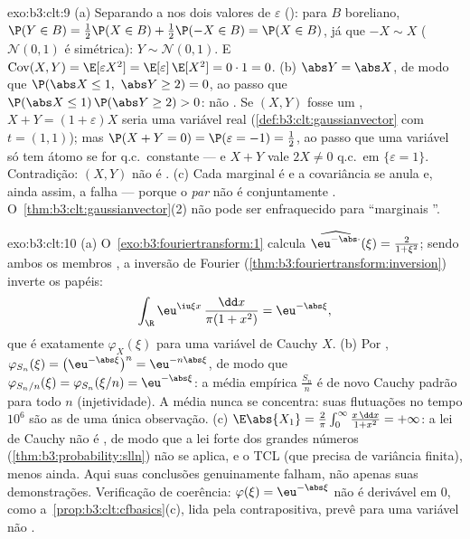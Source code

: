 \begin{solution}{exo:b3:clt:9}
(a) Separando a  nos dois valores de
$\varepsilon$ (): para $B$ boreliano, $\P(Y \in B) =
\frac12\P(X \in B) + \frac12\P(-X \in B) = \P(X \in B)$,
já que $-X \sim X$ ($\mathcal N(0,1)$ é simétrica): $Y \sim
\mathcal N(0,1)$. E $\operatorname{Cov}(X, Y) =
\E[\varepsilon X^2] = \E[\varepsilon]\,\E[X^2] = 0 \cdot 1 =
0$.
(b) $\abs Y = \abs X$, de modo que $\P(\abs X \leq 1,\ \abs Y \geq 2)
= 0$, ao passo que $\P(\abs X \leq 1)\,\P(\abs Y \geq 2) > 0$: não
. Se $(X, Y)$ fosse um , $X + Y =
(1 + \varepsilon)X$ seria uma variável  real
(\cref{def:b3:clt:gaussianvector} com $t = (1,1)$); mas
$\P(X + Y = 0) = \P(\varepsilon = -1) = \frac12$, ao passo que uma
variável  só tem átomo se for q.c.\ constante
--- e $X + Y$ vale $2X \neq 0$ q.c.\ em
$\{\varepsilon = 1\}$. Contradição: $(X, Y)$ não é
.
(c) Cada marginal é  e a covariância se anula
e, ainda assim, a  falha --- porque o \emph{par} não é
conjuntamente . O~\cref{thm:b3:clt:gaussianvector}(2) não pode
ser enfraquecido para ``marginais ''.
\end{solution}

\begin{solution}{exo:b3:clt:10}
(a) O~\cref{exo:b3:fouriertransform:1} calcula
$\widehat{\eu^{-\abs\cdot}}(\xi) = \frac{2}{1 + \xi^2}$;
sendo ambos os membros , a inversão de Fourier
(\cref{thm:b3:fouriertransform:inversion}) inverte os papéis:
\[
\int_\R\eu^{\iu\xi x}\,\frac{\dd x}{\pi(1 + x^2)} =
\eu^{-\abs\xi},
\]
que é exatamente $\varphi_X(\xi)$ para uma variável de Cauchy $X$.
(b) Por , $\varphi_{S_n}(\xi) =
\bigl(\eu^{-\abs\xi}\bigr)^n = \eu^{-n\abs\xi}$, de modo que
$\varphi_{S_n/n}(\xi) = \varphi_{S_n}(\xi/n) =
\eu^{-\abs\xi}$: a média empírica $\frac{S_n}n$ é de novo
Cauchy padrão para todo $n$ (injetividade). A média
nunca se concentra: suas flutuações no tempo $10^6$ são
as de uma única observação.
(c) $\E\abs{X_1} = \frac2\pi\int_0^\infty\frac{x\,\dd x}{1 +
x^2} = +\infty$: a lei de Cauchy não é , de modo que a
lei forte dos grandes números
(\cref{thm:b3:probability:slln}) não se aplica, e o TCL
(que precisa de variância finita), menos ainda. Aqui suas
conclusões genuinamente falham, não apenas suas demonstrações.
Verificação de coerência: $\varphi(\xi) = \eu^{-\abs\xi}$ não é
derivável em $0$, como a~\cref{prop:b3:clt:cfbasics}(c),
lida pela contrapositiva, prevê para uma variável não
.
\end{solution}

